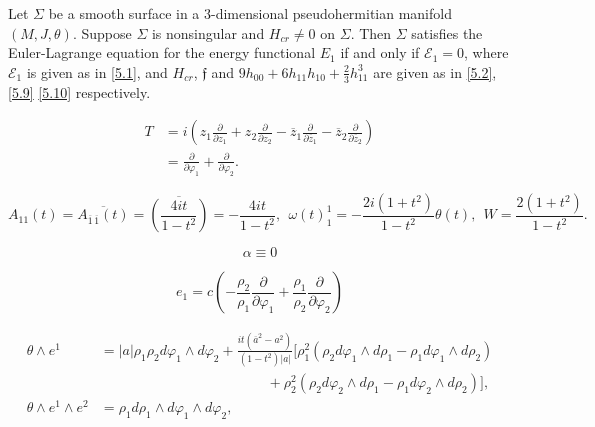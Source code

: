 \documentclass[10pt,a4paper]{amsart}
\begin{document}
\begin{theorem}\label{thm5.1}
Let $\Sigma$ be a smooth surface in a $3$-dimensional 
pseudohermitian manifold $(M,J,\theta)$. 
Suppose $\Sigma$ is nonsingular and $H_{cr}\neq 0$ on $\Sigma$. 
Then $\Sigma$ satisfies the Euler-Lagrange equation 
for the energy functional $E_1$
if and only if $\mathcal{E}_1=0$, 
where $\mathcal{E}_1$ is given as in 
\eqref{5.1}, 
and 
$H_{cr}$, $\mathfrak{f}$
and $9h_{00}+6h_{11}h_{10}+\frac{2}{3}h_{11}^3$ 
are given as in \eqref{5.2}, \eqref{5.9}
\eqref{5.10} respectively. 
\end{theorem}

\begin{equation}\label{10.3}
\begin{split}
T&=i\left(z_1\frac{\partial}{\partial z_1}+z_2\frac{\partial}{\partial z_2}-\overline{z}_1\frac{\partial}{\partial\overline{z}_1}-\overline{z}_2\frac{\partial}{\partial\overline{z}_2}\right)\\
&=\frac{\partial}{\partial\varphi_1}+\frac{\partial}{\partial\varphi_2}.
\end{split}
\end{equation}

\begin{equation}\label{10.6}
A_{11}(t)=\overline{A_{\overline{1}\,\overline{1}}(t)}=\overline{\left(\frac{4it}{1-t^2}\right)}=-\frac{4it}{1-t^2},~~\omega(t)_1^1=-\frac{2i(1+t^2)}{1-t^2}\theta(t),~~W=\frac{2(1+t^2)}{1-t^2}.
\end{equation}

\begin{equation}\label{10.6A}
\alpha\equiv 0
\end{equation}

\begin{equation}\label{10.8}
e_1=c\left(-\frac{\rho_2}{\rho_1}\frac{\partial}{\partial\varphi_1}+\frac{\rho_1}{\rho_2}\frac{\partial}{\partial\varphi_2}\right)
\end{equation}

\begin{equation}\label{10.17}
\begin{split}
\theta\wedge e^1
&=|a|\rho_1\rho_2d\varphi_1\wedge d\varphi_2
+\frac{it(\overline{a}^2-a^2)}{(1-t^2)|a|}\Big[\rho_1^2(\rho_2d\varphi_1\wedge d\rho_1-\rho_1 d\varphi_1\wedge d\rho_2)\\
&\hspace{5cm}
+\rho_2^2(\rho_2 d\varphi_2\wedge d\rho_1-\rho_1d\varphi_2\wedge d\rho_2)\Big],\\
\theta\wedge e^1\wedge e^2
&=\rho_1 d\rho_1\wedge d\varphi_1\wedge d\varphi_2, 
\end{split}
\end{equation}
\end{document}
